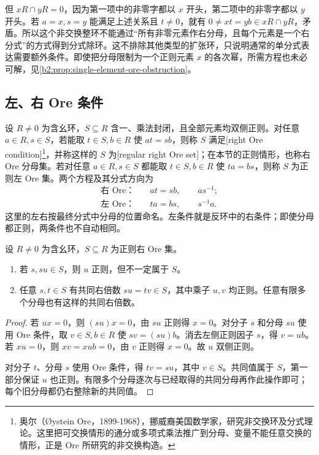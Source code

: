 \ProseParagraphBreak
但 \(xR\cap yR=0\)，因为第一项中的非零字都以 \(x\) 开头，第二项中的非零字都以 \(y\) 开头。若 \(a=x,s=y\) 能满足上述关系且 \(t\ne0\)，就有 \(0\ne xt=yb\in xR\cap yR\)，矛盾。所以这个非交换整环不能通过“所有非零元素作右分母，且每个元素是一个右分式”的方式得到分式除环。这不排除其他类型的扩张环，只说明通常的单分式表达需要额外条件。即使把分母限制为一个正则元素 \(x\) 的各次幂，所需方程也未必可解，见\cref{b2:prop:single-element-ore-obstruction}。

\subsection{左、右 Ore 条件}
\label{b2:subsec:1901:02}

\begin{definition}\label{b2:def:ore-set}
	设 \(R\ne0\) 为含幺环，\(S\subseteq R\) 含一、乘法封闭，且全部元素均双侧正则。对任意 \(a\in R,s\in S\)，若能取 \(t\in S,b\in R\) 使 \(at=sb\)，则称 \(S\) 满足[right Ore condition]\footnote{奥尔（Øystein Ore，1899-1968），挪威裔美国数学家，研究非交换环及分式理论。这里把可交换情形的通分或多项式乘法推广到分母、变量不能任意交换的情形，正是 Ore 所研究的非交换构造。}，并称这样的 \(S\) 为[regular right Ore set]；在本节的正则情形，也称右 Ore 分母集。若对任意 \(a\in R,s\in S\) 都能取 \(t\in S,b\in R\) 使 \(ta=bs\)，则称 \(S\) 为正则左 Ore 集。两个方程及其分式方向为
	\[
		\begin{aligned}
			\text{右 Ore：}&\quad at=sb,\qquad as^{-1};\\
			\text{左 Ore：}&\quad ta=bs,\qquad s^{-1}a.
		\end{aligned}
	\]
	这里的左右按最终分式中分母的位置命名。左条件就是反环中的右条件；即使分母都正则，两条件也不自动相同。
\end{definition}

\begin{lemma}\label{b2:lem:ore-common-denominators}
	设 \(R\ne0\) 为含幺环，\(S\subseteq R\) 为正则右 Ore 集。
	\begin{enumerate}
		\item 若 \(s,su\in S\)，则 \(u\) 正则，但不一定属于 \(S\)。
		\item 任意 \(s,t\in S\) 有共同右倍数 \(su=tv\in S\)，其中乘子 \(u,v\) 均正则。任意有限多个分母也有这样的共同右倍数。
	\end{enumerate}
\end{lemma}
\begin{proof}
	若 \(ux=0\)，则 \((su)x=0\)，由 \(su\) 正则得 \(x=0\)。对分子 \(s\) 和分母 \(su\) 使用 Ore 条件，取 \(v\in S,b\in R\) 使 \(sv=(su)b\)。消去左侧正则因子 \(s\)，得 \(v=ub\)。若 \(xu=0\)，则 \(xv=xub=0\)，由 \(v\) 正则得 \(x=0\)。故 \(u\) 双侧正则。

	对分子 \(t\)、分母 \(s\) 使用 Ore 条件，得 \(tv=su\)，其中 \(v\in S\)。共同值属于 \(S\)，第一部分保证 \(u\) 也正则。有限多个分母逐次与已经取得的共同分母再作此操作即可；每个旧分母都仍右整除新的共同值。
\end{proof}

